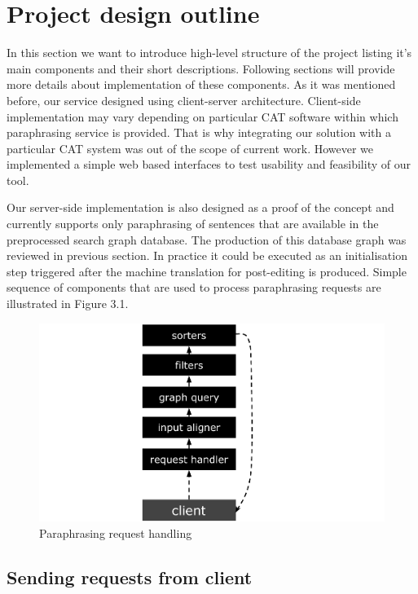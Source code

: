 \section{Project design outline}

In this section we want to introduce high-level structure of the project listing it's main components and their short descriptions. Following sections will provide more details about implementation of these components. As it was mentioned before, our service designed using client-server architecture. Client-side implementation may vary depending on particular CAT software within which paraphrasing service is provided.
That is why integrating our solution with a particular CAT system was out of the scope of current work. However we implemented a simple web based interfaces to test usability and feasibility of our tool. 

Our server-side implementation is also designed as a proof of the concept and currently supports only paraphrasing of sentences that are available in the preprocessed search graph database. The production of this database graph was reviewed in previous section. In practice it could be executed as an initialisation step triggered after the machine translation for post-editing is produced. Simple sequence of components that are used to process paraphrasing requests are illustrated in Figure 3.1.

\begin{figure}
 \centering 
 \includegraphics{g/system-outline.pdf}
 \caption{Paraphrasing request handling}
\end{figure}

\subsection{Sending requests from client}

